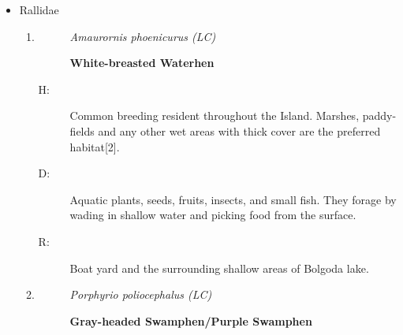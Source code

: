 \begin{itemize}
\begin{enumerate}
\begin{description}
\item[D: ]%
Diet encompasses a variety of food sources, including fruits, flower petals, nectar, and insects. Occasionally consume house geckos.%
\item[R: ]%
Throughout the university.%
\end{description}%
\item%
\begin{description}%
\item[]%
\textit{Pycnonotus luteolus (LC)}%
\item[]%
\textbf{White{-}browed Bulbul}%
\end{description}%
\begin{description}%
\item[H: ]%
Common breeding resident mainly in dry lowlands. Uncommon in wet lowlands and up to mid hills. Dry forests, scrub and gardens are the preferred habitat{[}2{]}.%
\item[D: ]%
Primarily feed on a diet consisting of fruit, nectar, and insects.%
\item[R: ]%
In kaju Kele and around the trees near Steel building%
\end{description}%
\end{enumerate}%
\item%
Rallidae%
\begin{enumerate}%
\item%
\begin{description}%
\item[]%
\textit{Amaurornis phoenicurus (LC)}%
\item[]%
\textbf{White{-}breasted Waterhen}%
\end{description}%
\begin{description}%
\item[H: ]%
Common breeding resident throughout the Island. Marshes, paddy-fields and any other wet areas with thick cover are the preferred habitat{[}2{]}.%
\item[D: ]%
Aquatic plants, seeds, fruits, insects, and small fish. They forage by wading in shallow water and picking food from the surface.%
\item[R: ]%
Boat yard and the surrounding shallow areas of Bolgoda lake.%
\end{description}%
\item%
\begin{description}%
\item[]%
\textit{Porphyrio poliocephalus (LC)}%
\item[]%
\textbf{Gray{-}headed Swamphen/Purple Swamphen}%

\end{description}
\end{enumerate}
\end{itemize}
